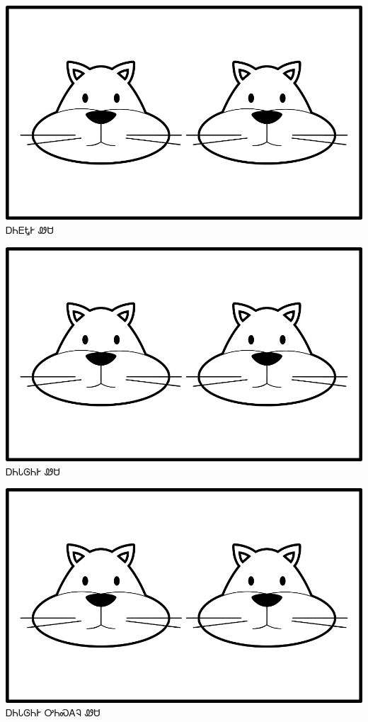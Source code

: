 \documentclass[avery5371]{flashcards}%
\begin{document}
\begin{flashcard}{
\includegraphics[width=0.95\columnwidth,height=.51\columnwidth,keepaspectratio]{../artwork/for-colors/wesa-anitali}
}
\Huge ᎠᏂᎬᎿᎨ ᏪᏌ
\end{flashcard}

\begin{flashcard}{
\includegraphics[width=0.95\columnwidth,height=.51\columnwidth,keepaspectratio]{../artwork/for-colors/wesa-anitali}
}
\Huge ᎠᏂᏓᎶᏂᎨ ᏪᏌ
\end{flashcard}

\begin{flashcard}{
\includegraphics[width=0.95\columnwidth,height=.51\columnwidth,keepaspectratio]{../artwork/for-colors/wesa-anitali}
}
\Huge ᎠᏂᏓᎶᏂᎨ ᎤᏂᏍᎪᎸ ᏪᏌ
\end{flashcard}
\end{document}
